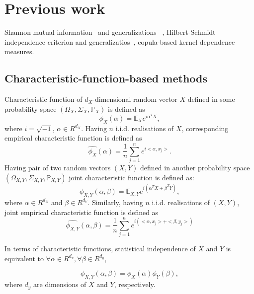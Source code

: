 \documentclass{article}
\begin{document}
\section{Previous work}
\label{section:previous_work}
Shannon mutual information~\cite{Cover2006} and generalizations ~\cite{e20110813},  Hilbert-Schmidt independence criterion \cite{Gretton2005MeasuringSD} and generalizatios~\cite{?}, \cite{Pczos2012CopulabasedKD} copula-based kernel dependence measures.

\subsection{Characteristic-function-based methods}
\label{section:previous_work_cf}
Characteristic function of $d_{X}$-dimensional random vector $X$ defined in some probability space $(\Omega_{X}, \Sigma_{X}, \mathbb{P}_{X})$ is defined as 
\begin{equation}
    \label{eq:characteristic_function}
    \phi_{X}(\alpha) = \mathbb{E}_{X} e^{i\alpha^{T}X}, 
\end{equation}
where $i=\sqrt{-1}$, $\alpha \in R^{d_{X}}$. Having $n$ i.i.d. realisations of $X$, corresponding empirical characteristic function is defined as
\begin{equation}
    \label{eq:ecf}
  \widehat{\phi_{X}}(\alpha) = \frac{1}{n} \sum_{j=1}^{n} e^{i <\alpha, x_{j}>}.
\end{equation}
Having pair of two random vectors $(X,Y)$ defined in another probability space $(\Omega_{X,Y}, \Sigma_{X,Y}, \mathbb{P}_{X,Y})$  joint characteristic function is defined as:
\begin{equation}
    \label{eq:joint_characteristic_function}
    \phi_{X,Y}(\alpha,\beta) = \mathbb{E}_{X,Y} e^{i(\alpha^{T}X + \beta^{T}Y)},
\end{equation}
where $\alpha \in R^{d_{X}}$ and $\beta \in R^{d_{Y}}$. Similarly, having 
$n$ i.i.d. realisations of $(X,Y)$, joint empirical characteristic function is defined as
\begin{equation}
    \label{eq:joint_ecf}
\widehat{\phi_{X,Y}}(\alpha,\beta) = \frac{1}{n} \sum_{j=1}^{n} e^{i(<\alpha, x_{j}> + <\beta, y_{j}>) }
\end{equation}

In terms of characteristic functions, statistical independence  of $X$ and $Y$ is equivalent to $\forall \alpha \in R^{d_x},\forall \beta \in R^{d_y} $, 

\begin{equation}
\phi_{X,Y}(\alpha,\beta) = \phi_{X}(\alpha) \phi_{Y}(\beta),
\end{equation}
where $d_{y}$ are dimensions of $X$ and $Y$, respectively.
\end{document}
